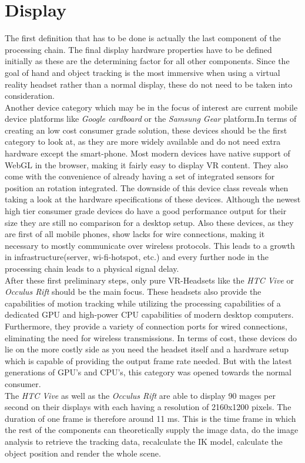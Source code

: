  \section{Display}
 The first definition that has to be done is actually the last component of the processing chain. The final display hardware properties have to be defined initially as these are the determining factor for all other components. Since the goal of hand and object tracking is the most immersive when using a virtual reality headset rather than a normal display, these do not need to be taken into consideration.\\
Another device category which may be in the focus of interest are current mobile device platforms like \textit{Google cardboard} or the \textit{Samsung Gear} platform.In terms of creating an low cost consumer grade solution, these devices should be the first category to look at, as they are more widely available and do not need extra hardware except the smart-phone. Most modern devices have native support of WebGL in the browser, making it fairly easy to display VR content. They also come with the convenience of already having a set of integrated sensors for position an rotation integrated. The downside of this device class reveals when taking a look at the hardware specifications of these devices. Although the newest high tier consumer grade devices do have a good performance output for their size they are still no comparison for a desktop setup.  Also these devices, as they are first of all mobile phones, show lacks for wire connections, making it necessary to mostly communicate over wireless protocols. This leads to a growth in infrastructure(server, wi-fi-hotspot, etc.) and every further node in the processing chain leads to a physical signal delay.\\
After these first preliminary steps, only pure VR-Headsets like the \textit{HTC Vive} or \textit{Occulus Rift} should be the main focus. These headsets also provide the capabilities of motion tracking while utilizing the processing capabilities of a dedicated GPU and high-power CPU capabilities of modern desktop computers. Furthermore, they provide a variety of connection ports for wired connections, eliminating the need for wireless transmissions. In terms of cost, these devices do lie on the more costly side as you need the headset itself and a hardware setup which is capable of providing the output frame rate needed. But with the latest generations of GPU's and CPU's, this category was opened towards the normal consumer.\\
The \textit{HTC Vive}  as well as the \textit{Occulus Rift} are able to display 90 mages per second on their displays with each having a resolution of 2160x1200 pixels. The duration of one frame is therefore around 11 ms. This is the time frame in which the rest of the components can theoretically supply the image data, do the image analysis to retrieve the tracking data, recalculate the IK model, calculate the object position and render the whole scene.
